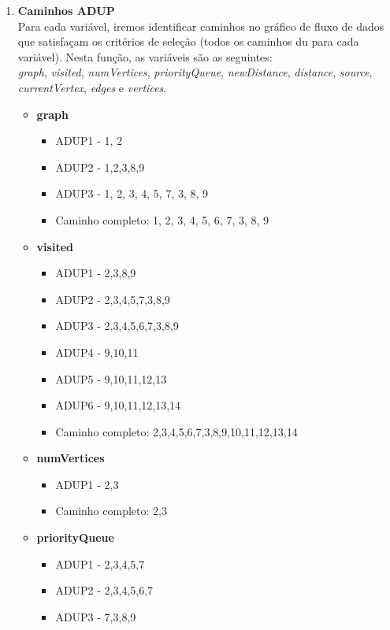 \documentclass{article}
\begin{document}
\begin{itemize}
\begin{enumerate}
    \item \textbf{Caminhos ADUP}\\
    Para cada variável, iremos identificar caminhos no gráfico de fluxo de dados que satisfaçam os critérios de seleção (todos os caminhos du
para cada variável).
    Nesta função, as variáveis são as seguintes:\\
    \textit{graph}, \textit{visited}, \textit{numVertices}, \textit{priorityQueue}, \textit{newDistance}, \textit{distance}, \textit{source}, \textit{currentVertex}, \textit{edges} e \textit{vertices}.
    \begin{itemize}
        \item \textbf{graph}
        \begin{itemize}
            \item ADUP1 - 1, 2
            \item ADUP2 - 1,2,3,8,9
            \item ADUP3 - 1, 2, 3, 4, 5, 7, 3, 8, 9
            \item Caminho completo: 1, 2, 3, 4, 5, 6, 7, 3, 8, 9
        \end{itemize}
        \item \textbf{visited}
        \begin{itemize}
            \item ADUP1 - 2,3,8,9
            \item ADUP2 - 2,3,4,5,7,3,8,9
            \item ADUP3 - 2,3,4,5,6,7,3,8,9
            \item ADUP4 - 9,10,11
            \item ADUP5 - 9,10,11,12,13
            \item ADUP6 - 9,10,11,12,13,14
            \item Caminho completo: 2,3,4,5,6,7,3,8,9,10,11,12,13,14
        \end{itemize}
        \item \textbf{numVertices}
        \begin{itemize}
            \item ADUP1 - 2,3
            \item Caminho completo: 2,3
        \end{itemize}
        \item \textbf{priorityQueue}
        \begin{itemize}
            \item ADUP1 - 2,3,4,5,7
            \item ADUP2 - 2,3,4,5,6,7
            \item ADUP3 - 7,3,8,9

\end{itemize}
\end{itemize}
\end{enumerate}
\end{itemize}
\end{document}
